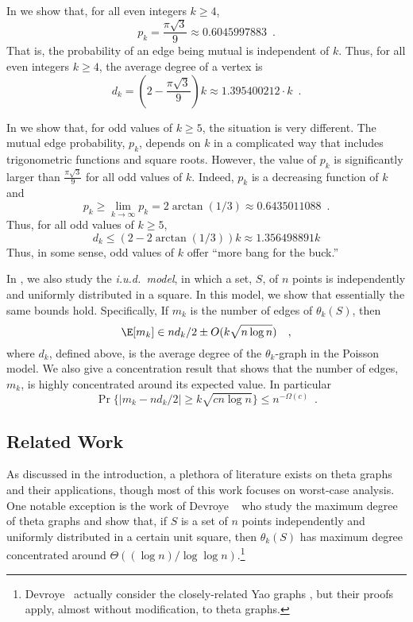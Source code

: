 \documentclass{patmorin}
\begin{document}
In  we show that, for all even integers $k\ge 4$,
\[
    p_k=\frac{\pi\sqrt{3}}{9}\approx 0.6045997883 \enspace .
\]
That is, the probability of an edge being mutual is independent of
$k$. Thus, for all even integers $k\ge 4$, the average degree of a
vertex is
\[
  d_k = \left(2-\frac{\pi\sqrt{3}}{9}\right)k \approx 1.395400212\cdot k \enspace .
\]

In  we show that, for odd values of $k\ge 5$, the situation
is very different.  The mutual edge probability, $p_k$, depends on
$k$ in a complicated way that includes trigonometric functions and
square roots.  However, the value of $p_k$ is significantly larger than
$\frac{\pi\sqrt{3}}{9}$ for all odd values of $k$.  Indeed, $p_k$ is a
decreasing function of $k$ and
\[
  p_k\ge \lim_{k\to\infty} p_k = 2\arctan(1/3)\approx 0.6435011088 \enspace .
\]
Thus, for all odd values of $k\ge 5$,
\[
   d_k \le (2-2\arctan(1/3))k \approx 1.356498891 k
\]
Thus, in some sense, odd values of $k$ offer ``more bang for the buck.''

In , we also study the \emph{i.u.d.\ model}, in which a
set, $S$, of $n$ points is independently and uniformly distributed in
a square.  In this model, we show that essentially the same bounds hold.
Specifically, If $m_k$ is the number of edges of $\theta_k(S)$, then
\[
    \E[m_k] \in nd_k/2\pm O(k\sqrt{n\log n}) \enspace \enspace ,
\]
where $d_k$, defined above, is the average degree of the $\theta_k$-graph
in the Poisson model.  We also give a concentration result that shows
that the number of edges, $m_k$, is highly concentrated around its
expected value.  In particular
\[
    \Pr\{|m_k - nd_k/2| \ge k\sqrt{cn\log n}\} \le n^{-\Omega(c)} \enspace .
\]

\subsection{Related Work}

As discussed in the introduction, a plethora of literature exists on
theta graphs and their applications, though most of this work focuses on
worst-case analysis.  One notable exception is the work of Devroye \etal\
\cite{devroye.gudmundsson.ea:on} who study the maximum degree of theta
graphs and show that, if $S$ is a set of $n$ points independently and
uniformly distributed in a certain unit square, then $\theta_k(S)$
has maximum degree concentrated around $\Theta((\log n)/\log\log
n)$.\footnote{Devroye \etal\ actually consider the closely-related Yao graphs
\cite{flinchbaugh.jones:strong,yao:on}, but their proofs apply,
almost without modification, to theta graphs.}
\end{document}

